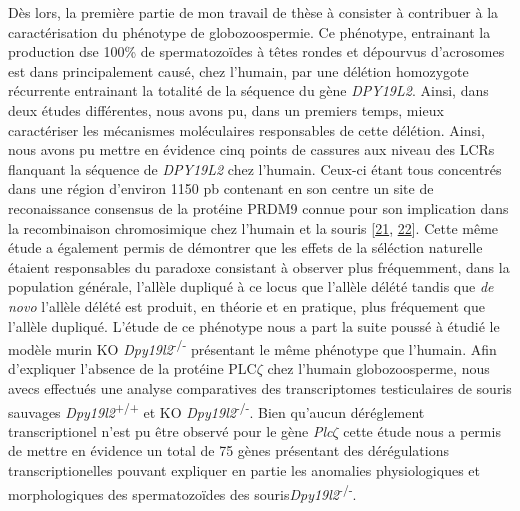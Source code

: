 \documentclass[12pt,twoside]{reedthesis}
\begin{document}
  Dès lors, la première partie de mon travail de thèse à consister à
  contribuer à la caractérisation du phénotype de globozoospermie. Ce
  phénotype, entrainant la production dse 100\% de spermatozoïdes à têtes
  rondes et dépourvus d'acrosomes est dans principalement causé, chez
  l'humain, par une délétion homozygote récurrente entrainant la totalité
  de la séquence du gène \emph{DPY19L2}. Ainsi, dans deux études
  différentes, nous avons pu, dans un premiers temps, mieux caractériser
  les mécanismes moléculaires responsables de cette délétion. Ainsi, nous
  avons pu mettre en évidence cinq points de cassures aux niveau des LCRs
  flanquant la séquence de \emph{DPY19L2} chez l'humain. Ceux-ci étant
  tous concentrés dans une région d'environ 1150 pb contenant en son
  centre un site de reconaissance consensus de la protéine PRDM9 connue
  pour son implication dans la recombinaison chromosimique chez l'humain
  et la souris {[}\protect\hyperlink{ref-Parvanov2010}{21},
  \protect\hyperlink{ref-Baudat2010}{22}{]}. Cette même étude a également
  permis de démontrer que les effets de la séléction naturelle étaient
  responsables du paradoxe consistant à observer plus fréquemment, dans la
  population générale, l'allèle dupliqué à ce locus que l'allèle délété
  tandis que \emph{de novo} l'allèle délété est produit, en théorie et en
  pratique, plus fréquement que l'allèle dupliqué. L'étude de ce phénotype
  nous a part la suite poussé à étudié le modèle murin KO
  \emph{Dpy19l2}\textsuperscript{-/-} présentant le même phénotype que
  l'humain. Afin d'expliquer l'absence de la protéine PLC\(\zeta\) chez
  l'humain globozoosperme, nous avecs effectués une analyse comparatives
  des transcriptomes testiculaires de souris sauvages
  \emph{Dpy19l2}\textsuperscript{+/+} et KO
  \emph{Dpy19l2}\textsuperscript{-/-}. Bien qu'aucun déréglement
  transcriptionel n'est pu être observé pour le gène \emph{Plc}\(\zeta\)
  cette étude nous a permis de mettre en évidence un total de 75 gènes
  présentant des dérégulations transcriptionelles pouvant expliquer en
  partie les anomalies physiologiques et morphologiques des spermatozoïdes
  des souris\emph{Dpy19l2}\textsuperscript{-/-}.
  
\end{document}
